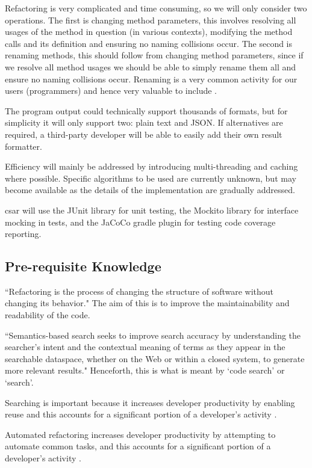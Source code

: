 \documentclass[12pt, letterpaper]{article}
\begin{document}
Refactoring is very complicated and time consuming, so we will only consider two operations.
The first is changing method parameters, this involves resolving all usages of the method in question (in various contexts), modifying the method calls and its definition and ensuring no naming collisions occur.
The second is renaming methods, this should follow from changing method parameters, since if we resolve all method usages we should be able to simply rename them all and ensure no naming collisions occur.
Renaming is a very common activity for our users (programmers) and hence very valuable to include \autocite{murphy2012we}.

The program output could technically support thousands of formats, but for simplicity it will only support two: plain text and JSON.
If alternatives are required, a third-party developer will be able to easily add their own result formatter.

Efficiency will mainly be addressed by introducing multi-threading and caching where possible.
Specific algorithms to be used are currently unknown, but may become available as the details of the implementation are gradually addressed.

csar will use the JUnit library for unit testing, the Mockito library for interface mocking in tests, and the JaCoCo gradle plugin for testing code coverage reporting.

\subsection{Pre-requisite Knowledge}
``Refactoring is the process of changing the structure of software without changing its behavior." \autocite{murphy2012we} The aim of this is to improve the maintainability and readability of the code.

``Semantics-based search seeks to improve search accuracy by understanding the searcher's intent and the contextual meaning of terms as they appear in the searchable dataspace, whether on the Web or within a closed system, to generate more relevant results." \autocite{wikipediasemanticsearch} Henceforth, this is what is meant by `code search' or `search'.

Searching is important because it increases developer productivity by enabling reuse and this accounts for a significant portion of a developer's activity \autocite{reiss2009semantics,stolee2014solving}.

Automated refactoring increases developer productivity by attempting to automate common tasks, and this accounts for a significant portion of a developer's activity \autocite{mens2004survey,murphy2012we}.
\end{document}
